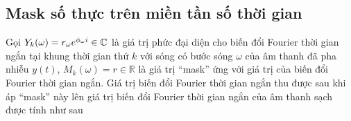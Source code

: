 
	\subsection{Mask số thực trên miền tần số thời gian}
		
		Gọi $Y_k(\omega) = r_\omega e^{\phi_\omega i} \in \mathbb{C}$ là giá trị phức đại diện cho biến đổi Fourier thời gian ngắn tại khung thời gian thứ $k$ với sóng có bước sóng $\omega$ của âm thanh đã pha nhiễu $y(t)$, $M_k(\omega) = r \in \mathbb{R}$ là giá trị ``mask'' ứng với giá trị của biến đổi Fourier thời gian ngắn. Giá trị biến đổi Fourier thời gian ngắn thu được sau khi áp ``mask'' này lên giá trị biến đổi Fourier thời gian ngắn của âm thanh sạch được tính như sau
		
